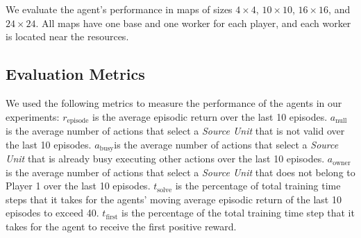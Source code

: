\documentclass[letterpaper]{article}
\begin{document}
We evaluate the agent's performance in maps of sizes $4\times4$, $10\times10$, $16\times16$, and $24\times24$. All maps have one base and one worker for each player, and each worker is located near the resources.



\subsection{Evaluation Metrics}
We used the following metrics to measure the performance of the agents in our experiments: $r_{\text{episode}}$ is the average episodic return  over the last 10 episodes.
$a_\text{null}$ is the average number of actions that select a {\em Source Unit} that is not valid  over the last 10 episodes. $a_\text{busy}$is the average number of actions that select a {\em Source Unit} that is already busy executing other actions over the last 10 episodes. $a_\text{owner}$ is the average number of actions that select a {\em Source Unit} that does not belong to Player 1 over the last 10 episodes. $t_\text{solve}$ is the percentage of total training time steps that it takes for the agents' moving average episodic return  of the last 10 episodes to exceed 40. $t_\text{first}$ is the percentage of the total training time step that it takes for the agent to receive the first positive reward.
\end{document}
